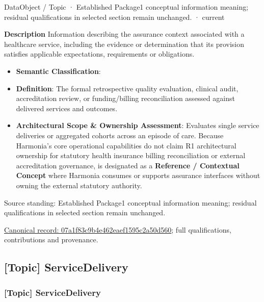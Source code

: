 \label{element:07a1f83c9b4e462eaef1595c2a50d560}
{\small DataObject / Topic · Established Package1 conceptual information meaning; residual qualifications in selected section remain unchanged. · current}\par

\textbf{Description}
Information describing the assurance context associated with a healthcare service, including the evidence or determination that its provision satisfies applicable expectations, requirements or obligations.



\begin{itemize}


\item \textbf{Semantic Classification}: \texttt{}

\item \textbf{Definition}: The formal retrospective quality evaluation, clinical audit, accreditation review, or funding/billing reconciliation assessed against delivered services and outcomes.

\item \textbf{Architectural Scope \& Ownership Assessment}: Evaluates single service deliveries or aggregated cohorts across an episode of care. Because Harmonia's core operational capabilities do not claim R1 architectural ownership for statutory health insurance billing reconciliation or external accreditation governance, \texttt{} is designated as a \textbf{Reference / Contextual Concept} where Harmonia consumes or supports assurance interfaces without owning the external statutory authority.

\end{itemize}


Source standing: Established Package1 conceptual information meaning; residual qualifications in selected section remain unchanged.


{\footnotesize \href{../../../../continuum/application/data-object/topic/07a1f83c9b4e462eaef1595c2a50d560.md}{Canonical record: 07a1f83c9b4e462eaef1595c2a50d560}; full qualifications, contributions and provenance.}\par
\subsection{[Topic] ServiceDelivery}

\subsubsection{[Topic] ServiceDelivery}

